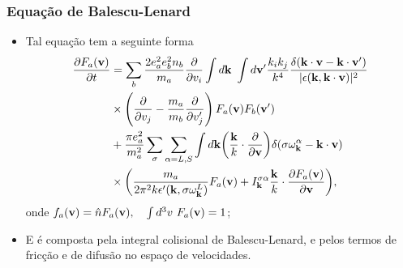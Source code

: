 \documentclass[10pt,aspectratio=1610,lualatex]{beamer}
\begin{document}
\begin{frame}
  \frametitle{Equação de Balescu-Lenard}
  \begin{itemize}
    \item Tal equação tem a seguinte forma
    \begin{equation}
      \begin{split}
	\frac{\partial F_a({\bf v})}{\partial t}
	&=\sum_b\frac{2e_a^2e_b^2n_b}{m_a}
	\frac{\partial }{\partial v_i}
	\int d{\bf k}\ \int d{\bf v'}\frac{k_ik_j}{k^4}
	\frac{\delta({\bf k \cdot v - k \cdot v'})}
	{|\epsilon({\bf k, k\cdot v})|^2}\\
	&\times \left(\frac{\partial }{\partial v_j}
	  -\frac{m_a}{m_b}\frac{\partial }{\partial v'_j}
	\right)F_a({\bf v})F_b({\bf v'})\\
	&+\frac{\pi e_a^2}{m_a^2}\sum_\sigma\sum_{\alpha=L,S}
	\int d{\bf k} \biggl(\frac{\bf k}{k}
	\cdot\frac{\partial}{\partial{\bf v}}\biggr)
	\delta(\sigma\omega_{\bf k}^\alpha-{\bf k}\cdot{\bf v})\\
	&\times\biggl(\frac{m_a}{2\pi^2k
	  \epsilon '({\bf k},\sigma\omega_{\bf k}^L)} F_a({\bf v})
	+I_{\bf k}^{\sigma\alpha} \frac{\bf k}{k}\cdot
	\frac{\partial F_a({\bf v})}{\partial{\bf v}}\biggr),
      \end{split}
   \label{Fa-gen}
    \end{equation}
    onde $f_a({\bf v})= \hat n F_a({\bf v}), \quad \int d^3v\ F_a({\bf v})=1$;
    \vspace{0.3cm}
    \item E é composta pela integral colisional de Balescu-Lenard,
    e pelos termos de fricção e de difusão no espaço de velocidades.
  \end{itemize}
\end{frame}
\end{document}
